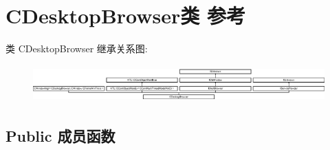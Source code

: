 \hypertarget{class_c_desktop_browser}{}\section{C\+Desktop\+Browser类 参考}
\label{class_c_desktop_browser}
类 C\+Desktop\+Browser 继承关系图\+:\begin{figure}[H]
\begin{center}
\leavevmode
\includegraphics[height=1.443299cm]{class_c_desktop_browser}
\end{center}
\end{figure}
\subsection*{Public 成员函数}
